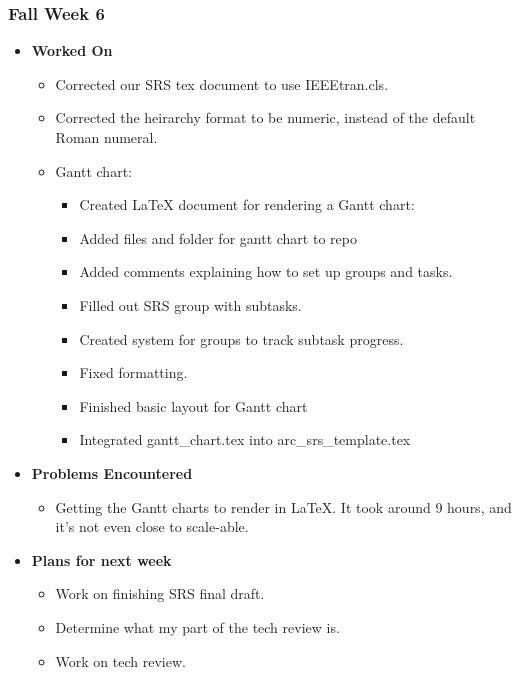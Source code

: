 \documentclass{article}
\begin{document}
\subsubsection{Fall Week 6}
\begin{itemize}
    \item {\textbf{Worked On}}
    \begin{itemize}
        \item Corrected our SRS tex document to use IEEEtran.cls.
        \item Corrected the heirarchy format to be numeric, instead of the default Roman numeral.
        \item Gantt chart:
        \begin{itemize}
            \item Created LaTeX document for rendering a Gantt chart:
            \item Added files and folder for gantt chart to repo
            \item Added comments explaining how to set up groups and tasks.
            \item Filled out SRS group with subtasks.
            \item Created system for groups to track subtask progress.
            \item Fixed formatting.
            \item Finished basic layout for Gantt chart
            \item Integrated gantt\_chart.tex into arc\_srs\_template.tex
        \end{itemize}
    \end{itemize}

    \item {\textbf{Problems Encountered}}
    \begin{itemize}
        \item Getting the Gantt charts to render in LaTeX. It took around 9 hours, and it's not even close to scale-able.
    \end{itemize}

    \item{\textbf{Plans for next week}}
    \begin{itemize}
        \item Work on finishing SRS final draft.
        \item Determine what my part of the tech review is.
        \item Work on tech review.
    \end{itemize}
\end{itemize}
\end{document}
